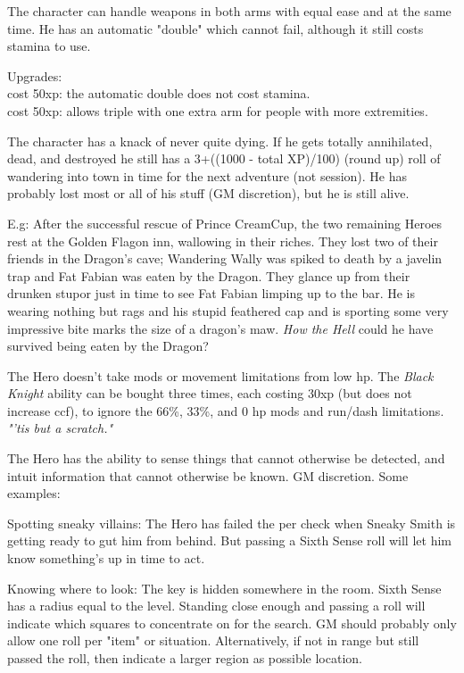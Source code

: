  The character can handle weapons in both arms with equal ease and at the same time. He has an automatic "double" which cannot fail, although it still costs stamina to use.

Upgrades:\\
cost 50xp: the automatic double does not cost stamina. \\
cost 50xp: allows triple with one extra arm for people with more extremities.


 The character has a knack of never quite dying. If he gets totally annihilated, dead, and destroyed he still has a 3+((1000 - total XP)/100) (round up) roll of wandering into town in time for the next adventure (not session). He has probably lost most or all of his stuff (GM discretion), but he is still alive.

E.g: After the successful rescue of Prince CreamCup, the two remaining Heroes rest at the Golden Flagon inn, wallowing in their riches. They lost two of their friends in the Dragon's cave; Wandering Wally was spiked to death by a javelin trap and Fat Fabian was eaten by the Dragon. They glance up from their drunken stupor just in time to see Fat Fabian limping up to the bar. He is wearing nothing but rags and his stupid feathered cap and is sporting some very impressive bite marks the size of a dragon's maw. \emph{How the Hell} could he have survived being eaten by the Dragon?


 The Hero doesn't take mods or movement limitations from low hp. The \emph{Black Knight} ability can be bought three times, each costing 30xp (but does not increase ccf), to ignore the 66\%, 33\%, and 0 hp mods and run/dash limitations. \emph{"'tis but a scratch."}


 The Hero has the ability to sense things that cannot otherwise be detected, and intuit information that cannot otherwise be known. GM discretion. Some examples:

Spotting sneaky villains: The Hero has failed the per check when Sneaky Smith is getting ready to gut him from behind. But passing a Sixth Sense roll will let him know something's up in time to act.

Knowing where to look: The key is hidden somewhere in the room. Sixth Sense has a radius equal to the level. Standing close enough and passing a roll will indicate which squares to concentrate on for the search. GM should probably only allow one roll per "item" or situation. Alternatively, if not in range but still passed the roll, then indicate a larger region as possible location.

